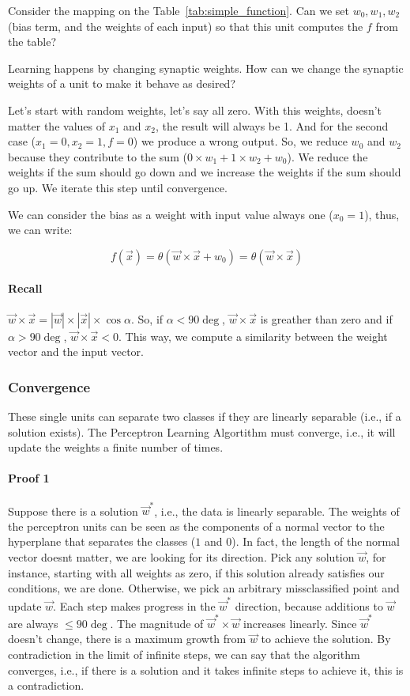 \documentclass[main]{subfiles}
\begin{document}
Consider the mapping on the Table~\ref{tab:simple_function}.
Can we set $w_0, w_1, w_2$ (bias term, and the weights of each input) so that this unit computes the $f$ from the table?

Learning happens by changing synaptic weights.
How can we change the synaptic weights of a unit to make it behave as desired?

Let's start with random weights, let's say all zero.
With this weights, doesn't matter the values of $x_1$ and $x_2$, the result will always be 1.
And for the second case ($x_1 = 0, x_2 = 1, f = 0$) we produce a wrong output.
So, we reduce $w_0$ and $w_2$ because they contribute to the sum ($0 \times w_1 + 1 \times w_2 + w_0$).
We reduce the weights if the sum should go down and we increase the weights if the sum should go up.
We iterate this step until convergence.

We can consider the bias as a weight with input value always one ($x_0 = 1$), thus, we can write:

\[ f(\vec{x}) = \theta(\vec{w} \times \vec{x} + w_0) = \theta(\vec{w} \times \vec{x}) \]

\paragraph{Recall} $\vec{w} \times \vec{x} = |\vec{w}| \times |\vec{x}| \times \cos \alpha$.
So, if $\alpha < 90\deg$, $\vec{w} \times \vec{x}$ is greather than zero and if $\alpha > 90\deg$, $\vec{w} \times \vec{x} < 0$.
This way, we compute a similarity between the weight vector and the input vector. \\

\subsubsection{Convergence}
These single units can separate two classes if they are linearly separable (i.e., if a solution exists).
The Perceptron Learning Algortithm must converge, i.e., it will update the weights a finite number of times.

\paragraph{Proof 1}
Suppose there is a solution $\vec{w}^*$, i.e., the data is linearly separable.
The weights of the perceptron units can be seen as the components of a normal vector to the hyperplane that separates the classes ($1$ and $0$).
In  fact, the  length of the normal vector doesnt matter, we are looking for its direction.
Pick any solution $\vec{w}$, for instance, starting with all weights as zero, if this solution already satisfies our conditions, we are done.
Otherwise, we pick an arbitrary missclassified point and update $\vec{w}$.
Each step makes progress in the $\vec{w}^*$ direction, because additions to $\vec{w}$ are always $\leq 90\deg$.
The magnitude of $\vec{w}^* \times \vec{w}$ increases linearly.
Since $\vec{w}^*$ doesn't change, there is a maximum growth from $\vec{w}$ to achieve the solution.
By contradiction in the limit of infinite steps, we can say that the algorithm converges, i.e., if there is a solution and it takes infinite steps to achieve it, this is a contradiction.
\end{document}
